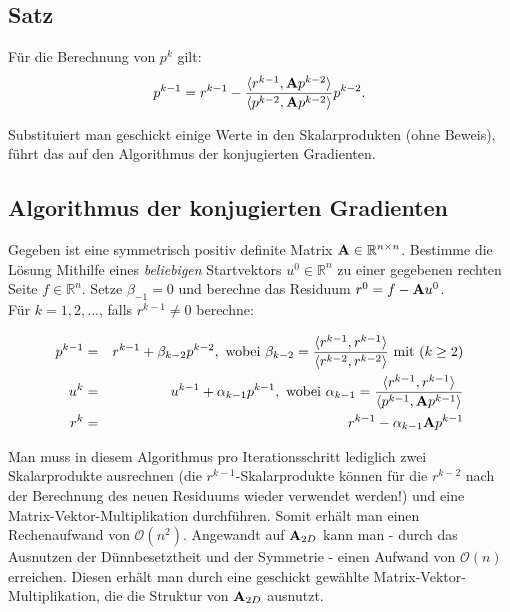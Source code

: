 \subsection{Satz}
Für die Berechnung von $p^{k}$ gilt:
\begin{equation}
p^{k-1} = r^{k-1} - \frac {\langle r^{k-1}, {\textbf{A}}p^{k-2} \rangle} {\langle p^{k-2}, {\textbf{A}}p^{k-2} \rangle} p^{k-2}.
\end{equation}

Substituiert man geschickt einige Werte in den Skalarprodukten (ohne Beweis), führt das auf den Algorithmus der konjugierten Gradienten.

\subsection{Algorithmus der konjugierten Gradienten}\label{ss.Numerisches CG}

Gegeben ist eine symmetrisch positiv definite Matrix ${\textbf{A}} \in \mathbb{R}^{n \times n}$. Bestimme die Lösung Mithilfe eines \textit{beliebigen} Startvektors $u^{0} \in \mathbb{R}^{n}$ zu einer gegebenen rechten Seite $f \in \mathbb{R}^{n}$. Setze $\beta_{-1} = 0$ und berechne das Residuum $r^{0} = f - {\textbf{A}}u^{0}$. \\
Für $k = 1,2,...$, falls $r^{k-1} \ne 0$ berechne:

\begin{eqnarray}
p^{k-1} &=& r^{k-1} + \beta_{k-2}p^{k-2}, \textnormal{ wobei } \beta_{k-2} = \frac {\langle r^{k-1}, r^{k-1} \rangle} {\langle r^{k-2}, r^{k-2} \rangle} \textnormal{ mit } (k \ge 2) \notag \\
u^{k} &=& u^{k-1} + \alpha_{k-1}p^{k-1}, \textnormal{ wobei } \alpha_{k-1} = \frac {\langle r^{k-1}, r^{k-1} \rangle} {\langle p^{k-1}, {\textbf{A}}p^{k-1} \rangle} \notag \\
r^{k} &=& r^{k-1} - \alpha_{k-1}{\textbf{A}}p^{k-1} \notag
\end{eqnarray}

Man muss in diesem Algorithmus pro Iterationsschritt lediglich zwei Skalarprodukte ausrechnen (die $r^{k-1}$-Skalarprodukte können für die $r^{k-2}$ nach der Berechnung des neuen Residuums wieder verwendet werden!) und eine Matrix-Vektor-Multiplikation durchführen. Somit erhält man einen Rechenaufwand von $\mathcal{O}(n^{2})$. Angewandt auf ${\textbf{A}}_{2D}$ kann man - durch das Ausnutzen der Dünnbesetztheit und der Symmetrie - einen Aufwand von $\mathcal{O}(n)$ erreichen. Diesen erhält man durch eine geschickt gewählte Matrix-Vektor-Multiplikation, die die Struktur von ${\textbf{A}}_{2D}$ ausnutzt.

